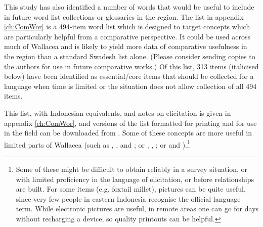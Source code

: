 This study has also identified a number of words that would be
useful to include in future word list collections or glossaries in the region.
The list in appendix \ref{ch:ComWor} is a 494-item word list which
is designed to target concepts which are particularly helpful
from a comparative perspective.
It could be used across much of Wallacea
and is likely to yield more data of comparative usefulness in
the region than a standard Swadesh list alone.
(Please consider sending copies to the authors for use in future
comparative works.) Of this list,
313 items (italicised below) have been identified as essential/core
items that should be collected for a language when time is limited
or the situation does not allow collection of all 494 items.

This list, with Indonesian equivalents, and notes on elicitation
is given in appendix \ref{ch:ComWor},
and versions of the list formatted for printing
and for use in the field can be downloaded from \textcolor{red}{}.
Some of these concepts are more useful in limited parts of Wallacea
(such as , , and ; or ,
, ; or 
and ).\footnote{
		Some of these might be difficult to
		obtain reliably in a survey situation,
		or with limited proficiency in the language of elicitation,
		or before relationships are built.
		For some items (e.g.
		foxtail millet), pictures can be quite useful,
		since very few people in eastern Indonesia recognise the official language term.
		While electronic pictures are useful,
		in remote areas one can go for days without recharging a device,
		so quality printouts can be helpful.}

